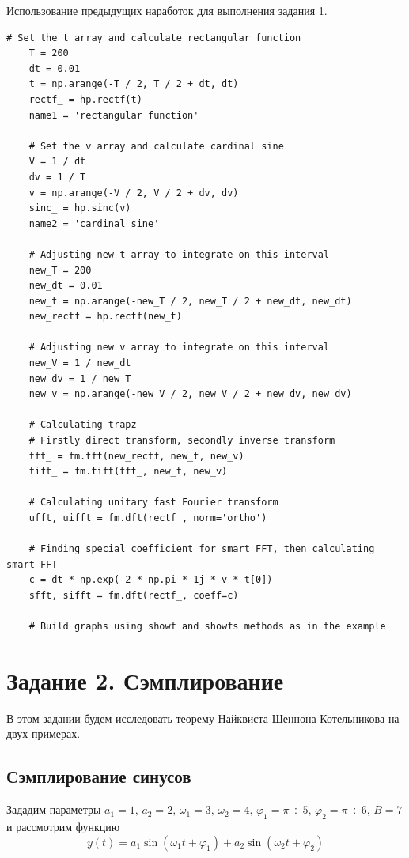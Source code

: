 \documentclass[a4paper, 12pt]{article}
\begin{document}
    Использование предыдущих наработок для выполнения задания 1.
    \begin{lstlisting}[label=t1, caption={Реализация задания 1}]
    # Set the t array and calculate rectangular function
    T = 200
    dt = 0.01
    t = np.arange(-T / 2, T / 2 + dt, dt)
    rectf_ = hp.rectf(t)
    name1 = 'rectangular function'

    # Set the v array and calculate cardinal sine
    V = 1 / dt
    dv = 1 / T
    v = np.arange(-V / 2, V / 2 + dv, dv)
    sinc_ = hp.sinc(v)
    name2 = 'cardinal sine'

    # Adjusting new t array to integrate on this interval
    new_T = 200
    new_dt = 0.01
    new_t = np.arange(-new_T / 2, new_T / 2 + new_dt, new_dt)
    new_rectf = hp.rectf(new_t)

    # Adjusting new v array to integrate on this interval
    new_V = 1 / new_dt
    new_dv = 1 / new_T
    new_v = np.arange(-new_V / 2, new_V / 2 + new_dv, new_dv)

    # Calculating trapz
    # Firstly direct transform, secondly inverse transform
    tft_ = fm.tft(new_rectf, new_t, new_v)
    tift_ = fm.tift(tft_, new_t, new_v)

    # Calculating unitary fast Fourier transform
    ufft, uifft = fm.dft(rectf_, norm='ortho')

    # Finding special coefficient for smart FFT, then calculating smart FFT
    c = dt * np.exp(-2 * np.pi * 1j * v * t[0])
    sfft, sifft = fm.dft(rectf_, coeff=c)

    # Build graphs using showf and showfs methods as in the example
    \end{lstlisting}


    \section{Задание 2. Сэмплирование}
    В этом задании будем исследовать теорему Найквиста-Шеннона-Котельникова на двух примерах.
    \subsection{Сэмплирование синусов}
    Зададим параметры $a_1=1,\,a_2=2,\,\omega_1=3,\,\omega_2=4,\,\varphi_1=\pi\div5,\,\varphi_2=\pi\div6,\,B=7$ и рассмотрим функцию
    $$y(t)=a_1\sin{(\omega_1t+\varphi_1)}+a_2\sin{(\omega_2t+\varphi_2)}$$
\end{document}
